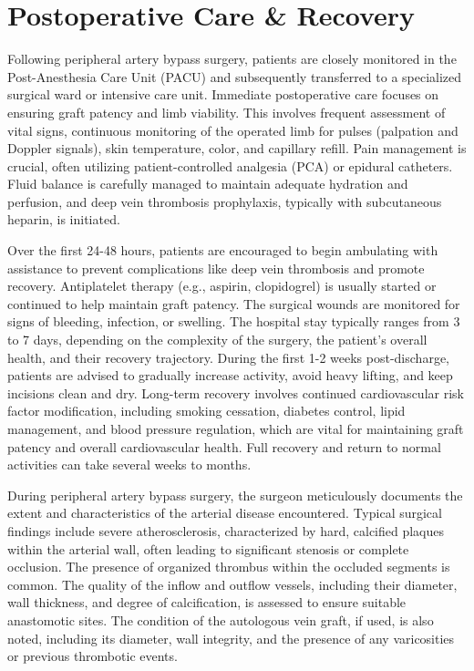 \section*{Postoperative Care \& Recovery}
Following peripheral artery bypass surgery, patients are closely monitored in the Post-Anesthesia Care Unit (PACU) and subsequently transferred to a specialized surgical ward or intensive care unit. Immediate postoperative care focuses on ensuring graft patency and limb viability. This involves frequent assessment of vital signs, continuous monitoring of the operated limb for pulses (palpation and Doppler signals), skin temperature, color, and capillary refill. Pain management is crucial, often utilizing patient-controlled analgesia (PCA) or epidural catheters. Fluid balance is carefully managed to maintain adequate hydration and perfusion, and deep vein thrombosis prophylaxis, typically with subcutaneous heparin, is initiated.

Over the first 24-48 hours, patients are encouraged to begin ambulating with assistance to prevent complications like deep vein thrombosis and promote recovery. Antiplatelet therapy (e.g., aspirin, clopidogrel) is usually started or continued to help maintain graft patency. The surgical wounds are monitored for signs of bleeding, infection, or swelling. The hospital stay typically ranges from 3 to 7 days, depending on the complexity of the surgery, the patient's overall health, and their recovery trajectory. During the first 1-2 weeks post-discharge, patients are advised to gradually increase activity, avoid heavy lifting, and keep incisions clean and dry. Long-term recovery involves continued cardiovascular risk factor modification, including smoking cessation, diabetes control, lipid management, and blood pressure regulation, which are vital for maintaining graft patency and overall cardiovascular health. Full recovery and return to normal activities can take several weeks to months.

During peripheral artery bypass surgery, the surgeon meticulously documents the extent and characteristics of the arterial disease encountered. Typical surgical findings include severe atherosclerosis, characterized by hard, calcified plaques within the arterial wall, often leading to significant stenosis or complete occlusion. The presence of organized thrombus within the occluded segments is common. The quality of the inflow and outflow vessels, including their diameter, wall thickness, and degree of calcification, is assessed to ensure suitable anastomotic sites. The condition of the autologous vein graft, if used, is also noted, including its diameter, wall integrity, and the presence of any varicosities or previous thrombotic events.

